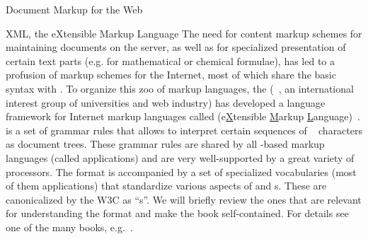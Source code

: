 \begin{tchapter}[id=markup-web]{Document Markup for the Web}
\begin{tsection}[id=xml]{XML, the eXtensible Markup Language}
  The need for content markup schemes for maintaining documents on the server, as well as
  for specialized presentation of certain text parts (e.g. for mathematical or chemical
  formulae), has led to a profusion of markup schemes for the Internet, most of which
  share the basic {\sgml} syntax with {\html}.  To organize this zoo of markup languages,
  the {} ({}~\cite{W3C:online}, an
  international interest group of universities and web industry) has developed a language
  framework for Internet markup languages called {\xml} (e{\underline{X}}tensible
  {\underline{M}}arkup {\underline{L}}anguage)~\cite{Bray:XML97}. {\xml} is a set of
  grammar rules that allows to interpret certain sequences of
  {}~\cite{Unicode:tuc03} characters as document trees. These grammar
  rules are shared by all {\xml}-based markup languages (called {\xml}
  applications) and are very well-supported by a great
  variety of {\xml} processors. The {\xml} format is
  accompanied by a set of specialized vocabularies (most of them {\xml} applications) that
  standardize various aspects of {} and
  {s}. These are canonicalized by the W3C as
  ``{s}''. We will briefly review the ones that are relevant for
  understanding the {\omdoc} format and make the book self-contained. For details see one
  of the many {\xml} books, e.g.~\cite{Harold:xb01}.


\end{tsection}
\end{tchapter}
